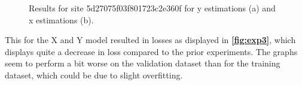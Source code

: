 \begin{figure}[H]
\centering
  \hfill
  \caption{Results for site 5d27075f03f801723c2e360f for y estimations (a) and x estimations (b).}
  \label{fig:exp4}
\end{figure}

This for the X and Y model resulted in losses as displayed in \textbf{\autoref{fig:exp3}}, which displays quite a decrease in loss compared to the prior experiments. The graphs seem to perform a bit worse on the validation dataset than for the training dataset, which could be due to slight overfitting.

